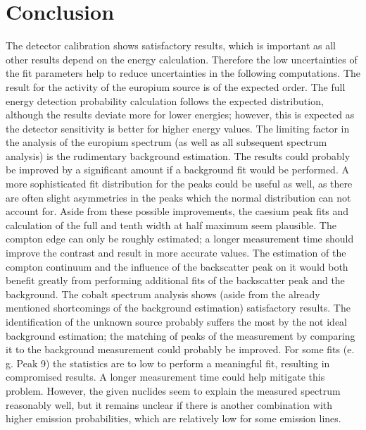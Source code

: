 \section{Conclusion}
The detector calibration shows satisfactory results, which is important as all
other results depend on the energy calculation. Therefore the low uncertainties
of the fit parameters help to reduce uncertainties in the following computations.
The result for the activity of the europium source is of the expected order.
The full energy detection probability calculation follows the expected distribution,
although the results deviate more for lower energies; however, this is expected as the
detector sensitivity is better for higher energy values. The limiting factor in the
analysis of the europium spectrum (as well as all subsequent spectrum analysis) is the
rudimentary background estimation. The results could probably be improved by a significant
amount if a background fit would be performed. A more sophisticated fit distribution for the peaks could
be useful as well, as there are often slight asymmetries in the peaks which the normal distribution
can not account for. Aside from these possible improvements, the caesium peak fits and calculation
of the full and tenth width at half maximum seem plausible. The compton edge can only
be roughly estimated; a longer measurement time should improve the contrast and result
in more accurate values. The estimation of the compton continuum and the influence of
the backscatter peak on it would both benefit greatly from performing additional fits
of the backscatter peak and the background. The cobalt spectrum analysis shows (aside from
the already mentioned shortcomings of the background estimation) satisfactory results.
The identification of the unknown source probably suffers the most by the not ideal background
estimation; the matching of peaks of the measurement by comparing it to the background
measurement could probably be improved. For some fits (e. g. Peak 9) the statistics are
to low to perform a meaningful fit, resulting in compromised results. A longer measurement
time could help mitigate this problem. However, the given nuclides seem to explain the
measured spectrum reasonably well, but it remains unclear if there is another combination
with higher emission probabilities, which are relatively low for some emission lines.
